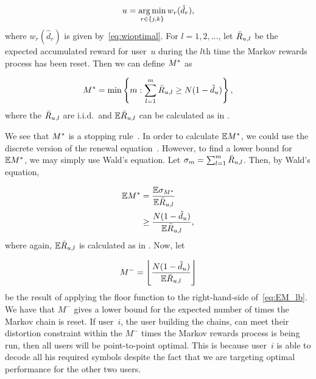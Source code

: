 \begin{align}
\label{eq:u_bottleneck}
	u = \operatorname*{arg\,min}_{r \in \{j, k\}} w_r(\hat{d}_r),
\end{align}
where $w_r(\hat{d}_r)$ is given by~\eqref{eq:wioptimal}.  For $l = 1, 2, \ldots $, let $\bar{R}_{u, l}$ be the expected accumulated reward for user~$u$ during the $l$th time the Markov rewards process has been reset.  Then we can define $M^{*}$ as

\begin{align}
	M^{*} = \min\left\{ m : \sum_{l = 1}^{m} \bar{R}_{u, l} \geq N(1 - \hat{d}_{u}) \right\},
\end{align}
where the $\bar{R}_{u, l}$ are i.i.d.\ and $\mathbb{E}\bar{R}_{u, l}$ can be calculated as in \cite[Corollary~\markovcor{}]{TMK_markov}.

We see that $M^{*}$ is a stopping rule~\cite{Gallager96}.  In order to calculate $\mathbb{E}M^{*}$, we could use the discrete version of the renewal equation~\cite[Chapter~2]{MitovOmey14}.  However, to find a lower bound for $\mathbb{E}M^{*}$, we may simply use Wald's equation\cite{Gallager96}.  Let $\sigma_m = \sum_{l = 1}^{m} \bar{R}_{u, l}$.  Then, by Wald's equation, 

\begin{align}
	\mathbb{E}M^{*} &= \frac{\mathbb{E}\sigma_{M^{*}}}{\mathbb{E}\bar{R}_{u, l}} \\
	\label{eq:EM_lb}
	&\geq \frac{N(1 - \hat{d}_u)}{\mathbb{E}\bar{R}_{u, l}},
\end{align}
where again, $\mathbb{E}\bar{R}_{u, l}$ is calculated as in \cite[Corollary~\markovcor{}]{TMK_markov}.  
Now, let 

\begin{align}
\label{eq:Mstar}
	M^{-} = \left\lfloor{\frac{N(1 - \hat{d}_u)}{\mathbb{E}\ensuremath{\bar{R}_{u, l}}}}\right\rfloor
\end{align}
be the result of applying the floor function to the right-hand-side of~\eqref{eq:EM_lb}.  We have that $M^{-}$ gives a lower bound for the expected number of times the Markov chain is reset.  If user~$i$, the user building the chains, can meet their distortion constraint within the $M^{-}$ times the Markov rewards process is being run, then all users will be point-to-point optimal.  This is because user~$i$ is able to decode all his required symbols despite the fact that we are targeting optimal performance for the other two users.


